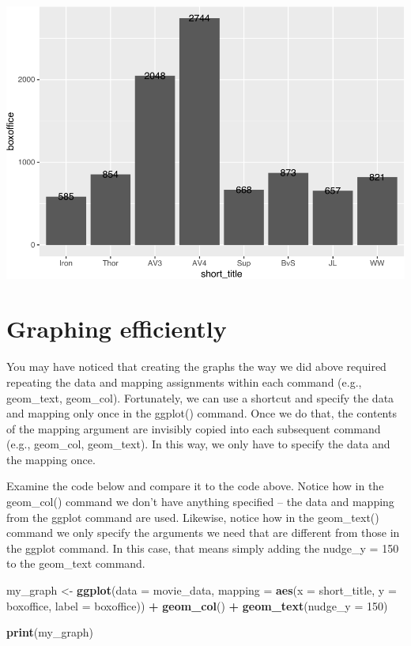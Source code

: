 \documentclass[
]{krantz}
\makeatletter
\newenvironment{Shaded}{\begin{snugshade}}{\end{snugshade}}
\newcommand{\DataTypeTok}[1]{\textcolor[rgb]{0.27,0.27,0.27}{#1}}
\newcommand{\DecValTok}[1]{\textcolor[rgb]{0.06,0.06,0.06}{#1}}
\newcommand{\KeywordTok}[1]{\textcolor[rgb]{0.27,0.27,0.27}{\textbf{#1}}}
\newcommand{\NormalTok}[1]{#1}
\newcommand{\OperatorTok}[1]{\textcolor[rgb]{0.43,0.43,0.43}{\textbf{#1}}}
\newcommand{\StringTok}[1]{\textcolor[rgb]{0.5,0.5,0.5}{#1}}
\newenvironment{kframe}{%
\medskip{}
\setlength{\fboxsep}{.8em}
 \def\at@end@of@kframe{}%
 \ifinner\ifhmode%
  \def\at@end@of@kframe{\end{minipage}}%
  \begin{minipage}{\columnwidth}%
 \fi\fi%
 \def\FrameCommand##1{\hskip\@totalleftmargin \hskip-\fboxsep
 \colorbox{shadecolor}{##1}\hskip-\fboxsep
     \hskip-\linewidth \hskip-\@totalleftmargin \hskip\columnwidth}%
 \MakeFramed {\advance\hsize-\width
   \@totalleftmargin\z@ \linewidth\hsize
   \@setminipage}}%
 {\par\unskip\endMakeFramed%
 \at@end@of@kframe}
\renewenvironment{Shaded}{\begin{kframe}}{\end{kframe}}
\makeatother
\begin{document}
\includegraphics{bookdown_files/figure-latex/unnamed-chunk-241-1.pdf}

\hypertarget{graphing-efficiently}{%
\section{Graphing efficiently}\label{graphing-efficiently}}

You may have noticed that creating the graphs the way we did above required repeating the data and mapping assignments within each command (e.g., geom\_text, geom\_col). Fortunately, we can use a shortcut and specify the data and mapping only once in the ggplot() command. Once we do that, the contents of the mapping argument are invisibly copied into each subsequent command (e.g., geom\_col, geom\_text). In this way, we only have to specify the data and the mapping once.

Examine the code below and compare it to the code above. Notice how in the geom\_col() command we don't have anything specified -- the data and mapping from the ggplot command are used. Likewise, notice how in the geom\_text() command we only specify the arguments we need that are different from those in the ggplot command. In this case, that means simply adding the nudge\_y = 150 to the geom\_text command.

\begin{Shaded}
\begin{Highlighting}[]
\NormalTok{my_graph <-}\StringTok{ }\KeywordTok{ggplot}\NormalTok{(}\DataTypeTok{data =}\NormalTok{ movie_data,}
           \DataTypeTok{mapping =} \KeywordTok{aes}\NormalTok{(}\DataTypeTok{x =}\NormalTok{ short_title,}
                         \DataTypeTok{y =}\NormalTok{ boxoffice,}
                         \DataTypeTok{label =}\NormalTok{ boxoffice)) }\OperatorTok{+}
\StringTok{  }\KeywordTok{geom_col}\NormalTok{() }\OperatorTok{+}
\StringTok{  }\KeywordTok{geom_text}\NormalTok{(}\DataTypeTok{nudge_y =} \DecValTok{150}\NormalTok{) }

\KeywordTok{print}\NormalTok{(my_graph)}
\end{Highlighting}
\end{Shaded}
\end{document}
